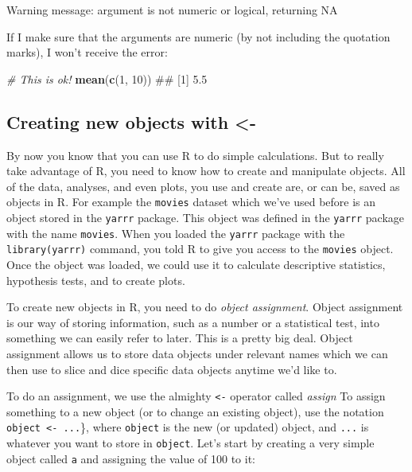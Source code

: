 \documentclass[]{book}
\newenvironment{Shaded}{\begin{snugshade}}{\end{snugshade}}
\newcommand{\KeywordTok}[1]{\textcolor[rgb]{0.13,0.29,0.53}{\textbf{{#1}}}}
\newcommand{\DecValTok}[1]{\textcolor[rgb]{0.00,0.00,0.81}{{#1}}}
\newcommand{\CommentTok}[1]{\textcolor[rgb]{0.56,0.35,0.01}{\textit{{#1}}}}
\newcommand{\NormalTok}[1]{{#1}}
\theoremstyle{definition}
\theoremstyle{definition}
\theoremstyle{remark}
\begin{document}
Warning message: argument is not numeric or logical, returning NA

If I make sure that the arguments are numeric (by not including the
quotation marks), I won't receive the error:

\begin{Shaded}
\begin{Highlighting}[]
\CommentTok{# This is ok!}
\KeywordTok{mean}\NormalTok{(}\KeywordTok{c}\NormalTok{(}\DecValTok{1}\NormalTok{, }\DecValTok{10}\NormalTok{))}
\NormalTok{## [1] 5.5}
\end{Highlighting}
\end{Shaded}

\subsection{Creating new objects with
\textless{}-}\label{creating-new-objects-with--}

By now you know that you can use R to do simple calculations. But to
really take advantage of R, you need to know how to create and
manipulate objects. All of the data, analyses, and even plots, you use
and create are, or can be, saved as objects in R. For example the
\texttt{movies} dataset which we've used before is an object stored in
the \texttt{yarrr} package. This object was defined in the
\texttt{yarrr} package with the name \texttt{movies}. When you loaded
the \texttt{yarrr} package with the
\texttt{library(\textquotesingle{}yarrr\textquotesingle{})} command, you
told R to give you access to the \texttt{movies} object. Once the object
was loaded, we could use it to calculate descriptive statistics,
hypothesis tests, and to create plots.

To create new objects in R, you need to do \emph{object assignment}.
Object assignment is our way of storing information, such as a number or
a statistical test, into something we can easily refer to later. This is
a pretty big deal. Object assignment allows us to store data objects
under relevant names which we can then use to slice and dice specific
data objects anytime we'd like to.

To do an assignment, we use the almighty \texttt{\textless{}-} operator
called \emph{assign} To assign something to a new object (or to change
an existing object), use the notation
\texttt{object\ \textless{}-\ ...}\}, where \texttt{object} is the new
(or updated) object, and \texttt{...} is whatever you want to store in
\texttt{object}. Let's start by creating a very simple object called
\texttt{a} and assigning the value of 100 to it:
\end{document}
